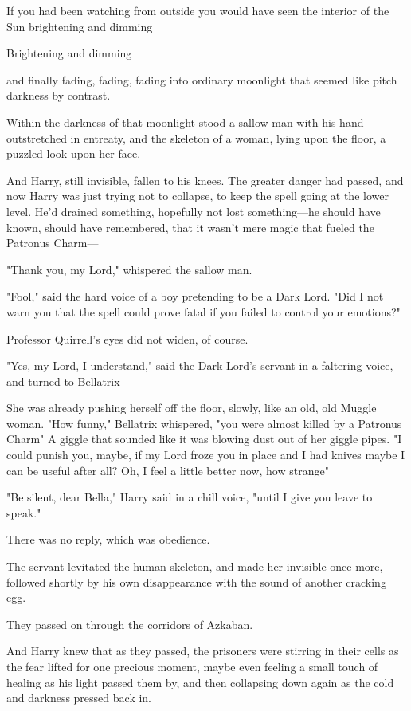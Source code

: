 If you had been watching from outside you would have seen the interior of the
Sun brightening and dimming{\el}

Brightening and dimming{\el}

{\el} and finally fading, fading, fading into ordinary moonlight that seemed
like pitch darkness by contrast.

Within the darkness of that moonlight stood a sallow man with his hand
outstretched in entreaty, and the skeleton of a woman, lying upon the floor, a
puzzled look upon her face.

And Harry, still invisible, fallen to his knees. The greater danger had passed,
and now Harry was just trying not to collapse, to keep the spell going at the
lower level. He'd drained something, hopefully not lost something---he
should have known, should have remembered, that it wasn't mere magic that
fueled the Patronus Charm---

"Thank you, my Lord," whispered the sallow man.

"Fool," said the hard voice of a boy pretending to be a Dark Lord. "Did I not
warn you that the spell could prove fatal if you failed to control your
emotions?"

Professor Quirrell's eyes did not widen, of course.

"Yes, my Lord, I understand," said the Dark Lord's servant in a faltering
voice, and turned to Bellatrix---

She was already pushing herself off the floor, slowly, like an old, old Muggle
woman. "How funny," Bellatrix whispered, "you were almost killed by a Patronus
Charm{\el}" A giggle that sounded like it was blowing dust out of her giggle
pipes. "I could punish you, maybe, if my Lord froze you in place and I had
knives{\el} maybe I can be useful after all? Oh, I feel a little better now,
how strange{\el}"

"Be silent, dear Bella," Harry said in a chill voice, "until I give you leave
to speak."

There was no reply, which was obedience.

The servant levitated the human skeleton, and made her invisible once more,
followed shortly by his own disappearance with the sound of another cracking
egg.

They passed on through the corridors of Azkaban.

And Harry knew that as they passed, the prisoners were stirring in their cells
as the fear lifted for one precious moment, maybe even feeling a small touch of
healing as his light passed them by, and then collapsing down again as the cold
and darkness pressed back in.

